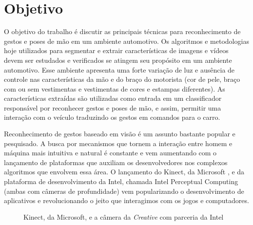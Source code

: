 \chapter{Objetivo}

O objetivo do trabalho é discutir as principais técnicas para reconhecimento de gestos e poses de mão em um ambiente automotivo.
Os algoritmos e metodologias hoje utilizados para segmentar e extrair características de imagens e vídeos devem ser estudados e verificados se atingem seu propósito em um ambiente automotivo. Esse ambiente apresenta uma forte variação de luz e ausência de controle nas características da mão e do braço do motorista (cor de pele, braço com ou sem vestimentas e vestimentas de cores e estampas diferentes). As características extraídas são utilizadas como entrada em um classificador responsável por reconhecer gestos e poses de mão, e assim, permitir uma interação com o veículo traduzindo os gestos em comandos para o carro.

Reconhecimento de gestos baseado em visão é um assunto bastante popular e pesquisado. A busca por mecanismos que tornem a interação entre homem e máquina mais intuitiva e natural é constante e vem aumentando com o lançamento de plataformas que auxiliam os desenvolvedores nos complexos algoritmos que envolvem essa área.
O lançamento do Kinect, da Microsoft \cite{kinect}, e da plataforma de desenvolvimento da Intel, chamada Intel Perceptual Computing \cite{intel} (ambas com câmeras de profundidade) vem popularizando o desenvolvimento de aplicativos e revolucionando o jeito que interagimos com os jogos e computadores. 

\begin{figure}[ht!]
\centering
{}
  \caption{Kinect, da Microsoft, e a câmera da \textit{Creative} com parceria da Intel}
  \label{fig:depth_camera}
\end{figure}

